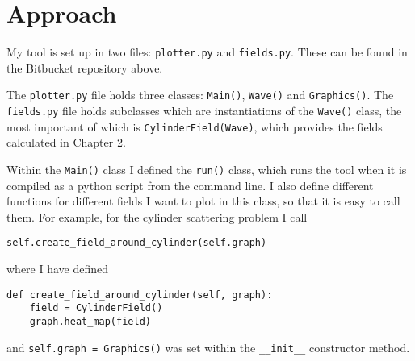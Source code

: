 \section{Approach}
%
My tool is set up in two files: \verb!plotter.py! and \verb!fields.py!. These can be found in the Bitbucket repository above. \par
%
The \verb!plotter.py! file holds three classes: \verb!Main()!, \verb!Wave()! and \verb!Graphics()!. The \verb!fields.py! file holds subclasses which are instantiations of the \verb!Wave()! class, the most important of which is \verb!CylinderField(Wave)!, which provides the fields calculated in Chapter 2.\par
%
Within the \verb!Main()! class I defined the \verb!run()! class, which runs the tool when it is compiled as a python script from the command line. I also define different functions for different fields I want to plot in this class, so that it is easy to call them. For example, for the cylinder scattering problem I call
%
  \begin{lstlisting}
self.create_field_around_cylinder(self.graph) \end{lstlisting}
%
where I have defined
%
  \begin{lstlisting}
def create_field_around_cylinder(self, graph):
    field = CylinderField()
    graph.heat_map(field) \end{lstlisting}
%
and \verb!self.graph = Graphics()! was set within the \verb!__init__! constructor method.
%
